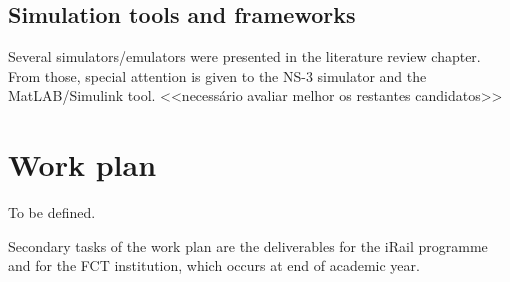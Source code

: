 \subsection{Simulation tools and frameworks}

Several simulators/emulators were presented in the literature review chapter. From those, special attention is given to the NS-3 simulator and the MatLAB/Simulink tool.  <<necessário avaliar melhor os restantes candidatos>>

\section{Work plan}
\label{sec:44}

To be defined.

Secondary tasks of the work plan are the deliverables for the iRail programme and for the FCT institution, which occurs at end of academic year. 


